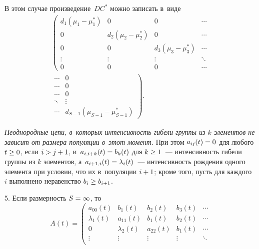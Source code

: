 \begin{multicols}{2}
\noindent 
В этом случае произведение~$DC^*$ можно записать в~виде
\begin{multline*}
\left(
\begin{array}{cccc}
d_1\left( \mu_1-\mu_1^*\right)                     & 0                                            
& 0                                       & \cdots \\
0                                                       & d_2\left( \mu_2-
\mu_2^*\right)          & 0                                       & \cdots \\
0                                                       & 0                                            
& d_3\left( \mu_3-\mu_3^*\right)     & \cdots \\
\vdots                                                  & \vdots                                       
& \vdots                                  & \ddots \\
 0                                                      & 0                                            
& 0                                       & \cdots 
\end{array}
\right.\\[3pt]
\left.
\begin{array}{cc}
 \cdots & 0\\
 \cdots & 0\\
\cdots & 0\\
 \ddots & \vdots\\
 \cdots & d_{S-1}\left( \mu_{S-1}-\mu_{S-1}^*\right)
\end{array}
\right).
\end{multline*}


  \textit{Неоднородные цепи, в~которых интенсивность гибели 
группы из $k$ элементов не зависит от размера популяции в~этот момент.} При 
этом   $a_{ij}(t)\hm=0$ для любого $t\hm \ge 0$, если $i\hm>j\hm+1$, 
и~$a_{i,i+k}(t)\hm=b_k(t)$ для $k\hm\ge 1$~--- интенсивность гибели 
группы из $k$ элементов, а~$a_{i+1,i}(t)\hm=\lambda_{i}(t)$~--- 
интенсивность рождения одного элемента при условии, что их в~популяции $i\hm+1$;
  кроме того, пусть для каждого~$i$ выполнено неравенство $b_{i}\hm \geq b_{i+1}$.



\smallskip

5. Если размерность $S\hm=\infty$, то
\begin{equation*}
A\left( t\right) =  \left(
\begin{array}{ccccc}
a_{00}(t)     & b_1(t)       & b_2(t)    & b_3(t) &\cdots   \\
\lambda_1(t)  & a_{11}(t)    & b_1(t)    & b_2(t) &\cdots   \\
0             & \lambda_2(t) & a_{22}(t) & b_1(t) &\cdots   \\
\vdots        & \vdots       & \vdots    & \vdots &\ddots   \\


\end{array}
\end{equation*}
\end{multicols}
